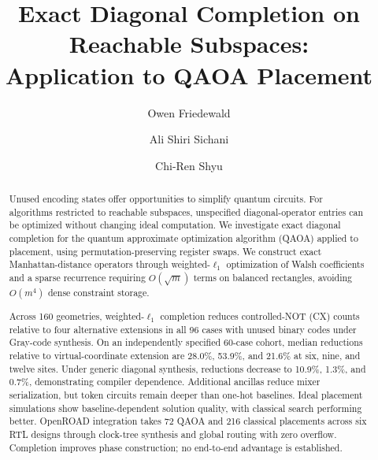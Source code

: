 \documentclass[manuscript,screen,review]{acmart}
\begin{document}
\title{Exact Diagonal Completion on Reachable Subspaces:\\
Application to QAOA Placement}
\author{Owen Friedewald}
\author{Ali Shiri Sichani}
\author{Chi-Ren Shyu}
\renewcommand{\shortauthors}{Friedewald et al.}

\begin{abstract}
Unused encoding states offer opportunities to simplify quantum circuits. For
algorithms restricted to reachable subspaces, unspecified diagonal-operator
entries can be optimized without changing ideal computation. We investigate
exact diagonal completion for the quantum approximate optimization algorithm
(QAOA) applied to placement, using permutation-preserving register swaps. We
construct exact Manhattan-distance operators through weighted-$\ell_1$
optimization of Walsh coefficients and a sparse recurrence requiring
$O(\sqrt{m})$ terms on balanced rectangles, avoiding $O(m^4)$ dense constraint
storage.

Across 160 geometries, weighted-$\ell_1$ completion reduces controlled-NOT (CX)
counts relative to four alternative extensions in all 96 cases with unused
binary codes under Gray-code synthesis. On an independently specified 60-case
cohort, median reductions relative to virtual-coordinate extension are 28.0\%,
53.9\%, and 21.6\% at six, nine, and twelve sites. Under generic diagonal
synthesis, reductions decrease to 10.9\%, 1.3\%, and 0.7\%, demonstrating compiler
dependence. Additional ancillas reduce mixer serialization, but token circuits
remain deeper than one-hot baselines. Ideal placement simulations show
baseline-dependent solution quality, with classical search performing better.
OpenROAD integration takes 72 QAOA and 216 classical placements across six RTL
designs through clock-tree synthesis and global routing with zero overflow.
Completion improves phase construction; no end-to-end advantage is established.
\end{abstract}
\end{document}

